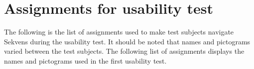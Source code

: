 \chapter{Assignments for usability test}\label{app:usatest}
The following is the list of assignments used to make test subjects navigate Sekvens during the usability test. It should be noted that names and pictograms varied between the test subjects. The following list of assignments displays the names and pictograms used in the first usability test.

